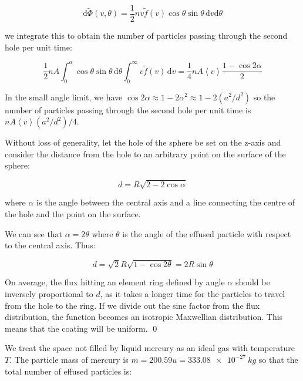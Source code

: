 \documentclass[12pt]{article}
\begin{document}
\begin{equation}
    \mathrm{d}\tilde{\Phi}(v, \theta) = \frac{1}{2} nv \tilde{f}(v) \cos{\theta} \sin{\theta} \, \mathrm{d}v \mathrm{d}\theta
\end{equation}

we integrate this to obtain the number of particles passing through the second hole per unit time:

\begin{equation}
    \frac{1}{2} nA \int_{0}^{\alpha} \cos{\theta} \sin{\theta} \, \mathrm{d}\theta \int_{0}^{\infty} v \tilde{f}(v) \, \mathrm{d}v = \frac{1}{4} nA \left\langle v \right\rangle \frac{1 - \cos{2\alpha}}{2}
\end{equation}

In the small angle limit, we have $\cos{2\alpha} \approx 1 - 2\alpha^{2} \approx 1 - 2(a^{2}/d^{2})$ so the number of particles passing through the second hole per unit time is $nA \left\langle v \right\rangle (a^{2}/d^{2})/4$.

Without loss of generality, let the hole of the sphere be set on the z-axis and consider the distance from the hole to an arbitrary point on the surface of the sphere:

\begin{equation}
    d = R \sqrt{2 - 2\cos{\alpha}}
\end{equation}

where $\alpha$ is the angle between the central axis and a line connecting the centre of the hole and the point on the surface.

We can see that $\alpha = 2\theta$ where $\theta$ is the angle of the effused particle with respect to the central axis. Thus:

\begin{equation}
    d = \sqrt{2}R \sqrt{1 - \cos{2\theta}} = 2R \sin{\theta}
\end{equation}

On average, the flux hitting an element ring defined by angle $\alpha$ should be inversely proportional to $d$, as it takes a longer time for the particles to travel from the hole to the ring. If we divide out the sine factor from the flux distribution, the function becomes an isotropic Maxwellian distribution. This means that the coating will be uniform.
\qed


We treat the space not filled by liquid mercury as an ideal gas with temperature $T$. The particle mass of mercury is $m = 200.59u = \qty{333.08e-27}{kg}$ so that the total number of effused particles is:
\end{document}
